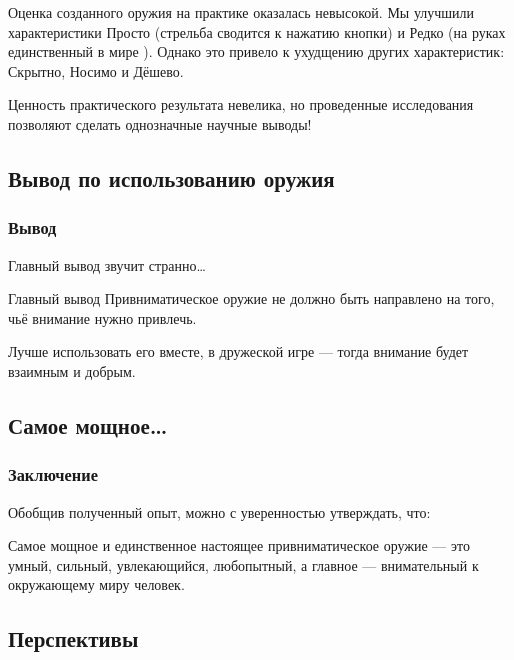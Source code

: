 Оценка созданного оружия на практике оказалась невысокой. Мы улучшили характеристики \alert{Просто} (стрельба сводится к нажатию кнопки) и \alert{Редко} (на руках единственный в мире {\myDevice}). Однако это привело к ухудщению других характеристик: Скрытно, Носимо и Дёшево.

Ценность практического результата невелика, но проведенные исследования позволяют сделать однозначные научные выводы!


\subsection{Вывод по использованию оружия}

\begin{frame}
    \frametitle{Вывод}
    
    Главный вывод звучит странно\ldots 
    
    \begin{block}{Главный вывод}
        Привниматическое оружие \alert{не должно} быть направлено на того, чьё внимание нужно привлечь. 
    \end{block}
    
    \par\bigskip
    
    Лучше использовать его вместе, в дружеской игре --- тогда внимание будет \alert{взаимным} и \alert{добрым}.
\end{frame}


\subsection{Самое мощное\ldots}

\begin{frame}
    \frametitle{Заключение}
    
    Обобщив полученный опыт, можно с уверенностью утверждать, что:
    
    \begin{block}{}
        Самое мощное и \alert{единственное настоящее} привниматическое оружие --- это умный, сильный, увлекающийся, любопытный, а главное --- \alert{внимательный к окружающему миру} человек.
    \end{block}
\end{frame}

    
\subsection{Перспективы}

